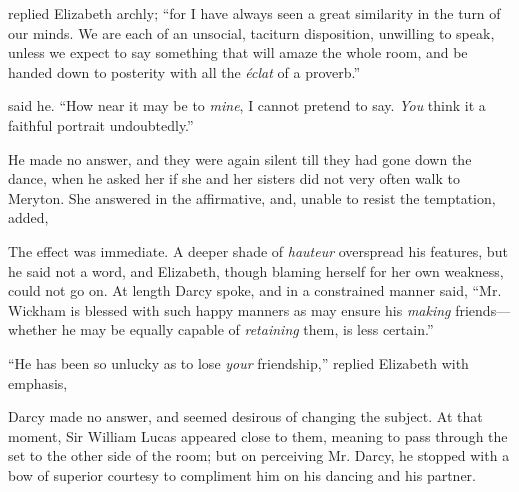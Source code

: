 
 replied Elizabeth archly; “for I have always seen a great similarity in the turn of our minds. We are each of an unsocial, taciturn disposition, unwilling to speak, unless we expect to say something that will amaze the whole room, and be handed down to posterity with all the {\em éclat} of a proverb.”

 said he. “How near it may be to {\em mine}, I cannot pretend to say. {\em You} think it a faithful portrait undoubtedly.”


He made no answer, and they were again silent till they had gone down the dance, when he asked her if she and her sisters did not very often walk to Meryton. She answered in the affirmative, and, unable to resist the temptation, added, 

The effect was immediate. A deeper shade of {\em hauteur} overspread his features, but he said not a word, and Elizabeth, though blaming herself for her own weakness, could not go on. At length Darcy spoke, and in a constrained manner said, “Mr. Wickham is blessed with such happy manners as may ensure his {\em making} friends---whether he may be equally capable of {\em retaining} them, is less certain.”

“He has been so unlucky as to lose {\em your} friendship,” replied Elizabeth with emphasis, 

Darcy made no answer, and seemed desirous of changing the subject. At that moment, Sir William Lucas appeared close to them, meaning to pass through the set to the other side of the room; but on perceiving Mr. Darcy, he stopped with a bow of superior courtesy to compliment him on his dancing and his partner.


